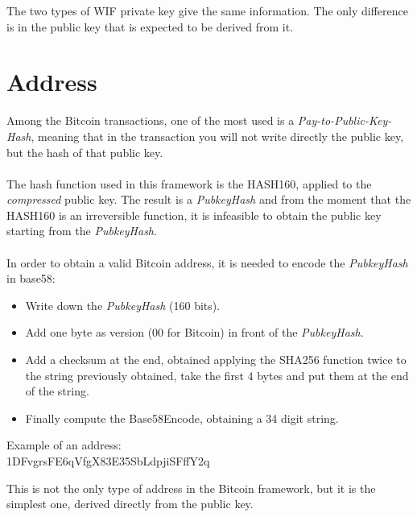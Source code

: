 \begin{remark}
	The two types of WIF private key give the same information. The only difference is in the public key that is expected to be derived from it. 
\end{remark}

\section{Address}
Among the Bitcoin transactions, one of the most used is a \textit{Pay-to-Public-Key-Hash}, meaning that in the transaction you will not write directly the public key, but the hash of that public key.
\\ \\
The hash function used in this framework is the HASH160, applied to the \textit{compressed} public key. The result is a \textit{PubkeyHash} and from the moment that the HASH160 is an irreversible function, it is infeasible to obtain the public key starting from the \textit{PubkeyHash}. \\ \\
In order to obtain a valid Bitcoin address, it is needed to encode the \textit{PubkeyHash} in base58:

\begin{itemize}
	\item Write down the \textit{PubkeyHash} (160 bits).
	\item Add one byte as version ($00$ for Bitcoin) in front of the \textit{PubkeyHash}.
	\item Add a checksum at the end, obtained applying the SHA256 function twice to the string previously obtained, take the first 4 bytes and put them at the end of the string.
	\item Finally compute the Base58Encode, obtaining a 34 digit string.
\end{itemize}
Example of an address: \\
1DFvgrsFE6qVfgX83E35SbLdpjiSFffY2q

\begin{remark}
	This is not the only type of address in the Bitcoin framework, but it is the simplest one, derived directly from the public key. 
\end{remark}
